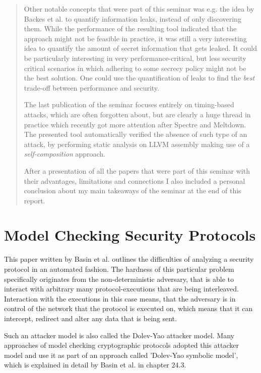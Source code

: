\documentclass[a4paper,UKenglish]{lipics-v2018}
\begin{document}
\begin{abstract}
Other notable concepts that were part of this seminar was e.g. the idea by Backes et al. to quantify information leaks, instead of only discovering them. While the performance of the resulting tool indicated that the approach might not be feasible in practice, it was still a very interesting idea to quantify the amount of secret information that gets leaked. It could be particularly interesting in very performance-critical, but less security critical scenarios in which adhering to some secrecy policy might not be the best solution. One could use the quantification of leaks to find the \textit{best} trade-off between performance and security.

The last publication of the seminar focuses entirely on timing-based attacks, which are often forgotten about, but are clearly a huge thread in practice which recently got more attention after Spectre and Meltdown. The presented tool automatically verified the absence of such type of an attack, by performing static analysis on LLVM assembly making use of a \textit{self-composition} approach.

After a presentation of all the papers that were part of this seminar with their advantages, limitations and connections I also included a personal conclusion about my main takeaways of the seminar at the end of this report.
\end{abstract}


\section{Model Checking Security Protocols}

This paper written by Basin et al. outlines the difficulties of analyzing a security protocol in an automated fashion. The hardness of this particular problem specifically originates from the non-deterministic adversary, that is able to interact with arbitrary many protocol-executions that are being interleaved. Interaction with the executions in this case means, that the adversary is in control of the network that the protocol is executed on, which means that it can intercept, redirect and alter any data that is being sent.\cite{model_checking_security_protocols}

Such an attacker model is also called the Dolev-Yao attacker model.  Many approaches of model checking cryptographic protocols adopted this attacker model and use it as part of an approach called 'Dolev-Yao symbolic model', which is explained in detail by Basin et al. in chapter 24.3.\cite{model_checking_security_protocols} 
\end{document}
